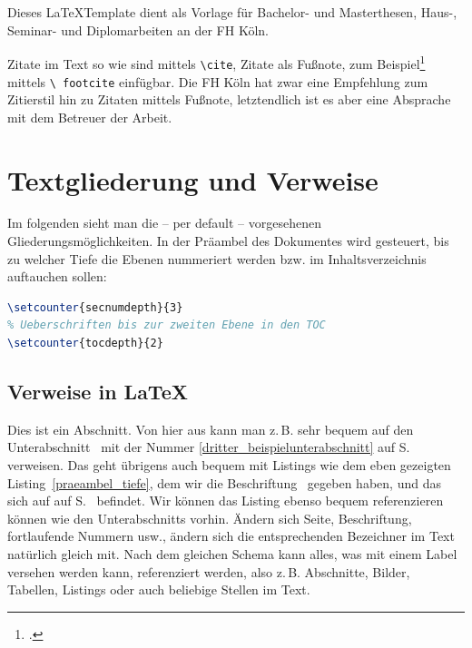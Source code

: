 \documentclass[12pt,oneside,a4paper,bibtotoc,liststotoc]{scrreprt}
\newcommand{\zB}{\mbox{z.\,B.}\xspace}
\begin{document}
Dieses \LaTeX Template dient als Vorlage für Bachelor- und
Masterthesen, Haus-, Seminar- und Diplomarbeiten an der \ac{FH} Köln.

Zitate im Text so wie \cite[vgl.][S.~1]{Lamport} sind mittels
\texttt{\textbackslash cite}, Zitate als Fußnote, zum
Beispiel\footcite[vgl.][S.~1]{Lamport} mittels \texttt{\textbackslash
  footcite} einfügbar. Die \ac{FH} Köln hat zwar eine Empfehlung zum
Zitierstil hin zu Zitaten mittels Fußnote, letztendlich ist es aber
eine Absprache mit dem Betreuer der Arbeit.

\chapter{Textgliederung und Verweise}

Im folgenden sieht man die -- per default -- vorgesehenen
Gliederungsmöglichkeiten. In der Präambel des Dokumentes wird
gesteuert, bis zu welcher Tiefe die Ebenen nummeriert werden bzw. im
Inhaltsverzeichnis auftauchen sollen:

\begin{lstlisting}[language=TeX,caption=Steuerung der
  Nummerierungstiefe und Inhaltsverzeichnistiefe in der
  Prämbel,label=praeambel_tiefe]
% Ueberschriften bis zur dritten Ebene durchnummerieren
\setcounter{secnumdepth}{3}
% Ueberschriften bis zur zweiten Ebene in den TOC
\setcounter{tocdepth}{2}
\end{lstlisting}

\section{Verweise in \LaTeX}

Dies ist ein Abschnitt. Von hier aus kann man \zB sehr bequem auf den
Unterabschnitt \glqq {}\grqq\
mit der Nummer \ref{dritter_beispielunterabschnitt} auf
S.~\pageref{dritter_beispielunterabschnitt} verweisen. Das geht
übrigens auch bequem mit Listings wie dem eben gezeigten
Listing~\ref{praeambel_tiefe}, dem wir die Beschriftung \glqq
{}\grqq\ gegeben haben, und das sich auf auf
S.~\pageref{praeambel_tiefe} befindet. Wir können das Listing ebenso
bequem referenzieren können wie den Unterabschnitts vorhin. Ändern
sich Seite, Beschriftung, fortlaufende Nummern usw., ändern sich die
entsprechenden Bezeichner im Text natürlich gleich mit. Nach dem
gleichen Schema kann alles, was mit einem Label versehen werden kann,
referenziert werden, also \zB Abschnitte, Bilder, Tabellen, Listings
oder auch beliebige Stellen im Text.
\end{document}
